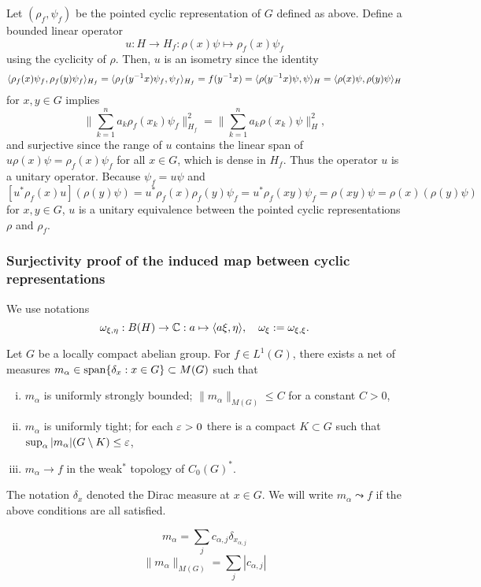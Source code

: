 \documentclass[a4paper]{article}
\begin{document}
\begin{pf}
Let $(\rho_f,\psi_f)$ be the pointed cyclic representation of $G$ defined as above.
Define a bounded linear operator
\[u:H\to H_f:\rho(x)\psi\mapsto\rho_f(x)\psi_f\]
using the cyclicity of $\rho$.
Then, $u$ is an isometry since the identity
\[\langle\rho_f(x)\psi_f,\rho_f(y)\psi_f\rangle_{H_f}=\langle\rho_f(y^{-1}x)\psi_f,\psi_f\rangle_{H_f}=f(y^{-1}x)=\langle\rho(y^{-1}x)\psi,\psi\rangle_H=\langle\rho(x)\psi,\rho(y)\psi\rangle_H\]
for $x,y\in G$ implies
\[\|\sum_{k=1}^na_k\rho_f(x_k)\psi_f\|_{H_f}^2=\|\sum_{k=1}^na_k\rho(x_k)\psi\|_H^2,\]
and surjective since the range of $u$ contains the linear span of $u\rho(x)\psi=\rho_f(x)\psi_f$ for all $x\in G$, which is dense in $H_f$.
Thus the operator $u$ is a unitary operator.
Because $\psi_f=u\psi$ and
\[[u^*\rho_f(x)u](\rho(y)\psi)=u^*\rho_f(x)\rho_f(y)\psi_f=u^*\rho_f(xy)\psi_f=\rho(xy)\psi=\rho(x)(\rho(y)\psi)\]
for $x,y\in G$, $u$ is a unitary equivalence between the pointed cyclic representations $\rho$ and $\rho_f$.
\end{pf}


\iffalse

\subsubsection*{Surjectivity proof of the induced map between cyclic representations}

We use notations
\[\omega_{\xi,\eta}:B(H)\to\mathbb{C}:a\mapsto\langle a\xi,\eta\rangle,\quad\omega_\xi:=\omega_{\xi,\xi}.\]

\begin{lem}
Let $G$ be a locally compact abelian group.
For $f\in L^1(G)$, there exists a net of measures $m_\alpha\in\operatorname{span}\{\delta_x:x\in G\}\subset M(G)$ such that
\begin{enumerate}[(i)]
\item $m_\alpha$ is uniformly strongly bounded; $\|m_\alpha\|_{M(G)}\le C$ for a constant $C>0$,
\item $m_\alpha$ is uniformly tight; for each $\varepsilon>0$ there is a compact $K\subset G$ such that $\sup_\alpha|m_\alpha|(G\setminus K)\le\varepsilon$,
\item $m_\alpha\to f$ in the weak$^*$ topology of $C_0(G)^*$.
\end{enumerate}
The notation $\delta_x$ denoted the Dirac measure at $x\in G$.
We will write $m_\alpha\leadsto f$ if the above conditions are all satisfied.
\end{lem}
\begin{pf}
\[m_\alpha=\sum_jc_{\alpha,j}\delta_{x_{\alpha,j}}\]
\[\|m_\alpha\|_{M(G)}=\sum_j|c_{\alpha,j}|\]
\end{pf}
\end{document}

